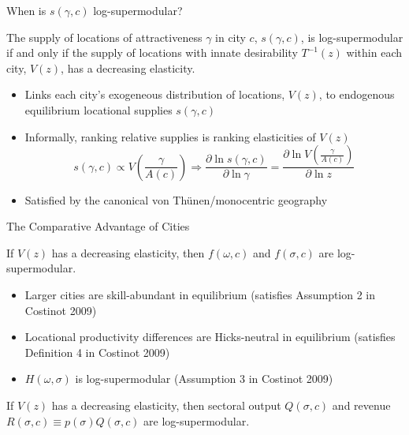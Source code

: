 \documentclass[10pt,notes=hide]{beamer}
\begin{document}
\begin{frame}{When is $s(\gamma,c)$ log-supermodular?}
\begin{proposition}
\label{prop:LocationDistribution}The supply of locations of attractiveness
$\gamma$ in city $c$, $s(\gamma,c)$, is log-supermodular if and
only if the supply of locations with innate desirability \textrm{\textup{$T^{-1}(z)$}}
within each city, $V(z)$, has a decreasing elasticity.\end{proposition}
\begin{itemize}
\item Links each city's exogeneous distribution of locations, $V(z)$, to
endogenous equilibrium locational supplies $s(\gamma,c)$
\item Informally, ranking relative supplies is ranking elasticities of $V(z)$
\[
s(\gamma,c)\propto V\left(\frac{\gamma}{A(c)}\right)\Rightarrow\frac{\partial\ln s(\gamma,c)}{\partial\ln\gamma}=\frac{\partial\ln V\left(\frac{\gamma}{A(c)}\right)}{\partial\ln z}
\]
\item Satisfied by the canonical von Th\"{u}nen/monocentric geography
\end{itemize}
\end{frame}
\begin{frame}{The Comparative Advantage of Cities}
\begin{corollary}
\label{cor:Skills-and-Sectors}If $V(z)$ has a decreasing elasticity,
then $f(\omega,c)$ and $f(\sigma,c)$ are log-supermodular.
\end{corollary}
\pause
\begin{itemize}
\item {\small{}Larger cities are skill-abundant in equilibrium (satisfies
Assumption 2 in Costinot 2009)}{\small \par}
\item {\small{}Locational productivity differences are Hicks-neutral in
equilibrium (satisfies Definition 4 in Costinot 2009)}{\small \par}
\item {\small{}$H(\omega,\sigma)$ is log-supermodular (Assumption 3 in
Costinot 2009)}{\small \par}\end{itemize}
\begin{corollary}
\label{Cor:Outputs-and-Revenues}If $V(z)$ has a decreasing elasticity,
then sectoral output $Q(\sigma,c)$ and revenue $R(\sigma,c)\equiv p(\sigma)Q(\sigma,c)$
are log-supermodular.
\end{corollary}
\end{frame}
\end{document}

